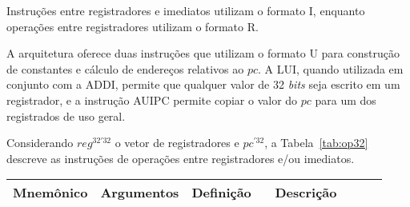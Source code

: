   Instruções entre registradores e imediatos utilizam o formato I, enquanto operações entre registradores 
  utilizam o formato R.
  
  A arquitetura oferece duas instruções que utilizam o formato U para construção de constantes e
  cálculo de endereços relativos ao $pc$. A LUI, quando utilizada em conjunto com a ADDI, permite que
  qualquer valor de 32 \emph{bits} seja escrito em um registrador, e a instrução AUIPC permite
  copiar o valor do $pc$ para um dos registrados de uso geral.

  Considerando $reg^{32'32}$ o vetor de registradores e $pc^{'32}$, a
  Tabela~\ref{tab:op32} descreve as instruções de operações entre registradores e/ou imediatos.

  \begin{table}
    \begin{tabular}{ |p{0.13\linewidth}||p{0.15\linewidth}|p{0.25\linewidth}|p{0.40\linewidth}| } 
      \hline
      Mnemônico & Argumentos & Definição & Descrição\\ \hline \hline


\end{tabular}
\end{table}
